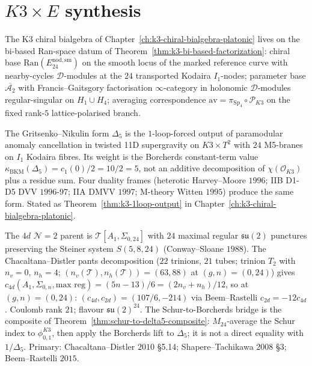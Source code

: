\section{\texorpdfstring{$K3 \times E$}{K3 x E} synthesis}
\label{sec:k3e-cy3-synthesis}

\begin{remark}
\label{rem:k3e-cy3-bi-based-synthesis}
The K3 chiral bialgebra of Chapter~\ref{ch:k3-chiral-bialgebra-platonic} lives on the bi-based Ran-space datum of Theorem~\ref{thm:k3-bi-based-factorization}: chiral base $\mathrm{Ran}(E^{\mathrm{nod,sm}}_{24})$ on the smooth locus of the marked reference curve with nearby-cycles $\mathcal{D}$-modules at the $24$ transported Kodaira $I_1$-nodes; parameter base $\overline{\mathcal{A}_2}$ with Francis--Gaitsgory factorisation $\infty$-category in holonomic $\mathcal{D}$-modules regular-singular on $H_1\cup H_4$; averaging correspondence $\mathrm{av}=\pi_{\mathrm{Sp}_4}\circ\mathscr P_{K3}$ on the fixed rank-\(5\) lattice-polarised branch.
\end{remark}

\begin{remark}
\label{rem:k3e-cy3-one-loop}
The Gritsenko--Nikulin form $\Delta_5$ is the $1$-loop-forced output of paramodular anomaly cancellation in twisted 11D supergravity on $K3\times T^2$ with $24$ M5-branes on $I_1$ Kodaira fibres. Its weight is the Borcherds constant-term value $\kappa_{\mathrm{BKM}}(\Delta_5)=c_1(0)/2=10/2=5$, not an additive decomposition of $\chi(\mathcal{O}_{K3})$ plus a residue sum. Four duality frames (heterotic Harvey--Moore $1996$; IIB D1-D5 DVV $1996$-$97$; IIA DMVV $1997$; M-theory Witten $1995$) produce the same form. Stated as Theorem~\ref{thm:k3-1loop-output} in Chapter~\ref{ch:k3-chiral-bialgebra-platonic}.
\end{remark}

\begin{remark}
\label{rem:k3e-cy3-classs}
The $4d$ $\mathcal{N}=2$ parent is $\mathcal{T}[A_1,\Sigma_{0,24}]$ with $24$ maximal regular $\mathfrak{su}(2)$ punctures preserving the Steiner system $S(5,8,24)$ (Conway--Sloane $1988$). The Chacaltana--Distler pants decomposition ($22$ trinions, $21$ tubes; trinion $T_2$ with $n_v = 0$, $n_h = 4$; $(n_v(\mathcal{T}), n_h(\mathcal{T})) = (63, 88)$ at $(g, n) = (0, 24)$) gives $c_{4d}(A_1, \Sigma_{0,n}, \text{max reg}) = (5n - 13)/6 = (2n_v + n_h)/12$, so at $(g, n) = (0, 24)$: $(c_{4d}, c_{2d}) = (107/6, -214)$ via Beem--Rastelli $c_{2d} = -12 c_{4d}$. Coulomb rank $21$; flavour $\mathfrak{su}(2)^{24}$. The Schur-to-Borcherds bridge is the composite of Theorem~\ref{thm:schur-to-delta5-composite}: $M_{24}$-average the Schur index to $\phi_{0,1}^{K3}$, then apply the Borcherds lift to $\Delta_5$; it is not a direct equality with $1/\Delta_5$. Primary: Chacaltana--Distler $2010$ \S 5.14; Shapere--Tachikawa $2008$ \S 3; Beem--Rastelli $2015$.
\end{remark}

